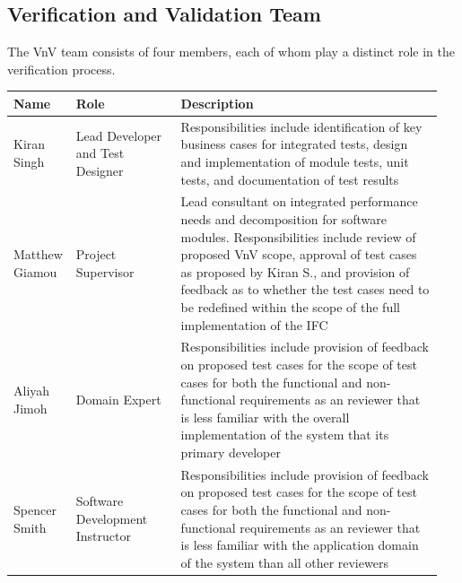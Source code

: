 \documentclass[12pt, titlepage]{article}
\begin{document}
\subsection{Verification and Validation Team}
The VnV team consists of four members, each of whom play a distinct role in the 
verification process.\\
\begin{tabular}{|p{0.11\linewidth}|p{0.24\linewidth}|p{0.6\linewidth}|} 
  \hline
  \textbf{Name} & \textbf{Role} & \textbf{Description}\\
  \hline
  Kiran Singh & Lead Developer and Test Designer & Responsibilities include 
  identification of key business cases for integrated tests,  design and 
  implementation of module tests, unit tests, and documentation of test 
  results\\
  \hline
  Matthew Giamou & Project Supervisor & Lead consultant on integrated 
  performance needs and decomposition for software modules. Responsibilities 
  include review of proposed VnV scope, approval of test cases as proposed by 
  Kiran S., and provision of feedback as to whether the test cases need to be 
  redefined within the scope of the full implementation of the IFC\\
  \hline
  Aliyah Jimoh & Domain Expert & Responsibilities include provision of 
  feedback on proposed test cases for the 
  scope of test cases for both the functional and non-functional requirements 
  as an reviewer that is less familiar with the overall implementation of the 
  system that its primary developer\\
  \hline
  Spencer Smith & Software Development Instructor & Responsibilities include 
  provision of feedback on proposed test cases for the scope of test cases 
  for both the functional and non-functional requirements as an reviewer that 
  is less familiar with the application domain of the system than all other 
  reviewers\\
  \bottomrule
\end{tabular}\\
\end{document}
